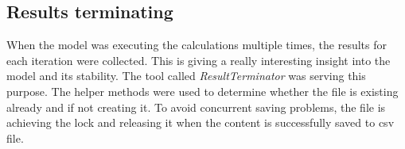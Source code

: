 \subsection{Results terminating}\label{subsec:results-terminating}
When the model was executing the calculations multiple times, the results for each iteration were collected.
This is giving a really interesting insight into the model and its stability.
The tool called \mbox{\textit{ResultTerminator}} was serving this purpose.
The helper methods were used to determine whether the file is existing already and if not creating it.
To avoid concurrent saving problems, the file is achieving the lock and releasing it when the content is successfully saved to \gls{csv} file.
